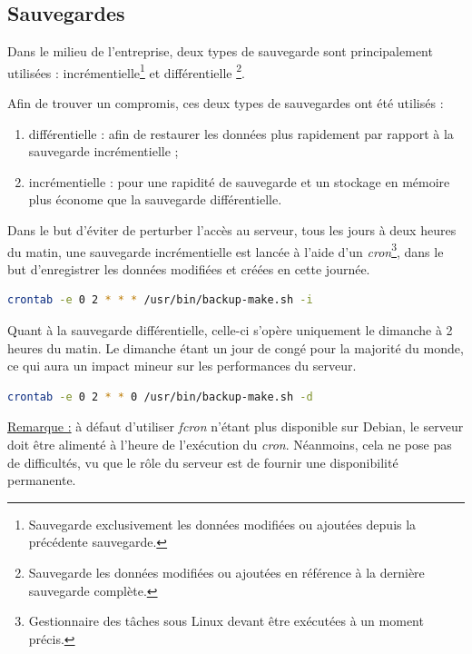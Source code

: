 \subsection{Sauvegardes}
\label{subsec:sauvegardes}

Dans le milieu de l'entreprise, deux types de sauvegarde sont principalement
utilisées : incrémentielle\footnote{Sauvegarde exclusivement les données
modifiées ou ajoutées depuis la précédente sauvegarde.} et différentielle
\footnote{Sauvegarde les données modifiées ou ajoutées en référence à la
dernière sauvegarde complète.}.

Afin de trouver un compromis, ces deux types de sauvegardes ont été utilisés :

\begin{enumerate}
\item différentielle : afin de restaurer les données plus rapidement par rapport
  à la sauvegarde incrémentielle ;

\item incrémentielle : pour une rapidité de sauvegarde et un stockage en mémoire
plus économe que la sauvegarde différentielle.
\end{enumerate}

Dans le but d'éviter de perturber l'accès au serveur, tous les jours à deux heures du matin, une
sauvegarde incrémentielle est lancée à l'aide d'un
\emph{cron}\footnote{Gestionnaire des tâches sous Linux devant être exécutées à
un moment précis.}, dans le but d'enregistrer les données modifiées et créées en
cette journée.

\begin{lstlisting}[language=bash]
crontab -e 0 2 * * * /usr/bin/backup-make.sh -i
\end{lstlisting}

Quant à la sauvegarde différentielle, celle-ci s'opère uniquement le dimanche à
2 heures du matin. Le dimanche étant un jour de congé pour la majorité du monde,
ce qui aura un impact mineur sur les performances du serveur.

\begin{lstlisting}[language=bash]
crontab -e 0 2 * * 0 /usr/bin/backup-make.sh -d
\end{lstlisting}

\underline{Remarque :} à défaut d'utiliser \textit{fcron} n'étant plus
disponible sur Debian, le serveur doit être alimenté à l'heure de l'exécution du
\textit{cron}. Néanmoins, cela ne pose pas de difficultés, vu que le rôle du
serveur est de fournir une disponibilité permanente.

